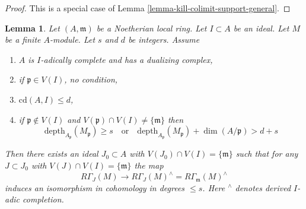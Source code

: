 \documentclass{stacks-project}
\theoremstyle{plain}
\newtheorem{lemma}[subsection]{Lemma}
\theoremstyle{definition}
\theoremstyle{remark}
\numberwithin{equation}{subsection}
\begin{document}
\begin{proof}
This is a special case of Lemma \ref{lemma-kill-colimit-support-general}.
\end{proof}

\begin{lemma}
\label{lemma-algebraize-local-cohomology}
Let $(A, \mathfrak m)$ be a Noetherian local ring.
Let $I \subset A$ be an ideal. Let $M$ be a finite $A$-module.
Let $s$ and $d$ be integers. Assume
\begin{enumerate}
\item $A$ is $I$-adically complete and has a dualizing complex,
\item if $\mathfrak p \in V(I)$, no condition,
\item $\text{cd}(A, I) \leq d$,
\item if $\mathfrak p \not \in V(I)$ and
$V(\mathfrak p) \cap V(I) \not = \{\mathfrak m\}$ then
$$
\text{depth}_{A_\mathfrak p}(M_\mathfrak p) \geq s
\quad\text{or}\quad
\text{depth}_{A_\mathfrak p}(M_\mathfrak p) + \dim(A/\mathfrak p) > d + s
$$
\end{enumerate}
Then there exists an ideal $J_0 \subset A$ with
$V(J_0) \cap V(I) = \{\mathfrak m\}$ such that for any $J \subset J_0$ with
$V(J) \cap V(I) = \{\mathfrak m\}$ the map
$$
R\Gamma_J(M) \longrightarrow
R\Gamma_J(M)^\wedge = R\Gamma_\mathfrak m(M)^\wedge
$$
induces an isomorphism in cohomology in degrees $\leq s$.
Here ${}^\wedge$ denotes derived $I$-adic completion.
\end{lemma}
\end{document}
